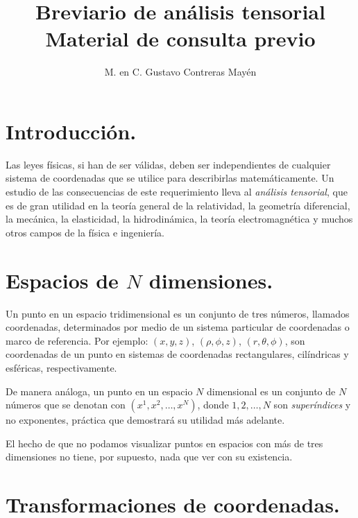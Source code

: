 
\usepackage{apacite}
\title{Breviario de análisis tensorial \\ \large{Material de consulta previo}\vspace{-3ex}}
\author{M. en C. Gustavo Contreras Mayén}
\date{ }

\vspace{-4cm}
\maketitle
\fontsize{14}{14}\selectfont
\tableofcontents
\newpage

\section{Introducción.}

Las leyes físicas, si han de ser válidas, deben ser independientes de cualquier sistema de coordenadas que se utilice para describirlas matemáticamente. Un estudio de las consecuencias de este requerimiento lleva al \emph{análisis tensorial}, que es de gran utilidad en la teoría general de la relatividad, la geometría diferencial, la mecánica, la elasticidad, la hidrodinámica, la teoría electromagnética y muchos otros campos de la física e ingeniería.

\section{Espacios de \texorpdfstring{$N$}{N} dimensiones.}

Un punto en un espacio tridimensional es un conjunto de tres números, llamados coordenadas, determinados por medio de un sistema particular de coordenadas o marco de referencia. Por ejemplo: $(x, y, z)$, $(\rho, \phi, z)$, $(r, \theta, \phi)$, son coordenadas de un punto en sistemas de coordenadas rectangulares, cilíndricas y esféricas, respectivamente.
\par
De manera análoga, un punto en un espacio $N$ dimensional es un conjunto de $N$ números que se denotan con $(x^{1}, x^{2}, \ldots, x^{N})$, donde $1, 2, \ldots, N$ son \emph{superíndices} y no exponentes, práctica que demostrará su utilidad más adelante.
\par
El hecho de que no podamos visualizar puntos en espacios con más de tres dimensiones no tiene, por supuesto, nada que ver con su existencia.

\section{Transformaciones de coordenadas.}

